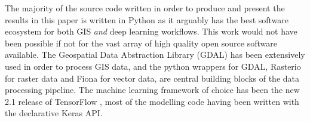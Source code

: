 The majority of the source code written in order to produce and present the results in this paper is written in Python as it arguably has the best software ecosystem for both GIS \emph{and} deep learning workflows.
This work would not have been possible if not for the vast array of high quality open source software available.
The Geospatial Data Abstraction Library (GDAL) \cite{dep:gdal} has been extensively used in order to process GIS data, and the python wrappers for GDAL, Rasterio \cite{dep:rasterio} for raster data and Fiona \cite{dep:fiona} for vector data, are central building blocks of the data processing pipeline.
The machine learning framework of choice has been the new 2.1 release of TensorFlow \cite{dep:tensorflow}, most of the modelling code having been written with the declarative Keras API.
